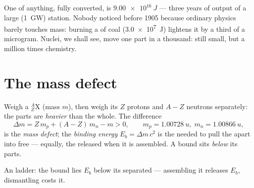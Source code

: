 \begin{example}\label{ex:g12:nuclear-energy:fortune}
One  of anything, fully converted, is $\qty{9.00e16}{J}$ --- three
years of output of a large (\qty{1}{GW})  station. Nobody noticed before
1905 because ordinary physics barely touches mass: burning a  of coal
(\qty{3.0e7}{J}) lightens it by a third of a microgram. Nuclei, we shall see,
move one part in a thousand: still small, but a million times chemistry.
\end{example}

\section{The mass defect}

\begin{definition}\label{def:g12:nuclear-energy:defect}
Weigh a  ${}^{A}_{Z}\mathrm{X}$ (mass $m$), then weigh its $Z$ protons
and $A - Z$ neutrons separately: the parts are \emph{heavier} than the whole.
The difference
\[
\Delta m = Z\,m_p + (A - Z)\,m_n - m > 0,
\qquad m_p = \qty{1.00728}{u},\; m_n = \qty{1.00866}{u},
\]
is the \emph{mass defect}; the \emph{binding
energy} $E_b = \Delta m\,c^2$ is the  needed to
pull the  apart into free  --- equally, the  released
when it is assembled. A bound  sits \emph{below} its parts.
\end{definition}

\begin{omfigure}

{\small An  ladder: the bound  lies $E_b$ below its separated
 --- assembling it releases $E_b$, dismantling costs it.}
\end{omfigure}

